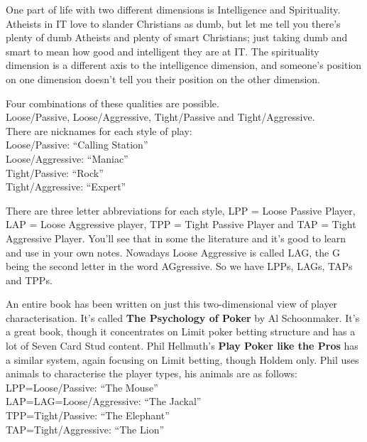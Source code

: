 
One part of life with two different dimensions is Intelligence and
Spirituality. Atheists in IT love to slander Christians as dumb,
but let me tell you there's plenty of dumb Atheists and plenty of
smart Christians; just taking dumb and smart to mean how good and
intelligent they are at IT. The spirituality dimension is a different
axis to the intelligence dimension, and someone's position on one
dimension doesn't tell you their position on the other dimension.


Four combinations of these qualities are possible. \\
Loose/Passive, Loose/Aggressive, Tight/Passive and Tight/Aggressive. \\
There are nicknames for each style of play: \\
Loose/Passive: ``Calling Station'' \\
Loose/Aggressive: ``Maniac'' \\
Tight/Passive: ``Rock'' \\
Tight/Aggressive: ``Expert''

There are three letter abbreviations for each style, LPP = Loose
Passive Player, LAP = Loose Aggressive player, TPP = Tight Passive
Player and TAP = Tight Aggressive Player. You'll see that in some the
literature and it's good to learn and use in your own notes. Nowadays
Loose Aggressive is called LAG, the G being the second letter in the
word AGgressive. So we have LPPs, LAGs, TAPs and TPPs.


An entire book has been written on just this two-dimensional view
of player characterisation. It's called \textbf{The Psychology of Poker}
by Al Schoonmaker. It's a great book, though it concentrates
on Limit poker betting structure and has a lot of Seven Card Stud
content. Phil Hellmuth's \textbf{Play Poker like the Pros} has a
similar system, again focusing on Limit betting, though Holdem only.
Phil uses animals to characterise the player types, his animals are
as follows: \\
LPP=Loose/Passive: ``The Mouse'' \\
LAP=LAG=Loose/Aggressive: ``The Jackal'' \\
TPP=Tight/Passive: ``The Elephant'' \\
TAP=Tight/Aggressive: ``The Lion''

